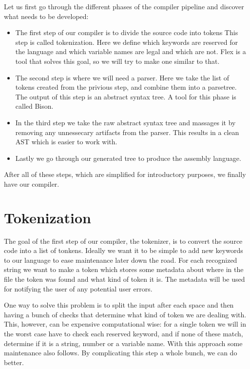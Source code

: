 \documentclass[a4paper,12pt]{report}
\begin{document}
Let us first go through the different phases of the compiler pipeline and discover what needs to be developed:
\begin{itemize}
  \item The first step of our compiler is to divide the source code into tokens This step is called tokenization. Here we define which keywords are reserved for the language and which variable names are legal and which are not. Flex is a tool that solves this goal, so we will try to make one similar to that.
  \item The second step is where we will need a parser. Here we take the list of tokens created from the privious step, and combine them into a parsetree. The output of this step is an abstract syntax tree. A tool for this phase is called Bison.
  \item In the third step we take the raw abstract syntax tree and massages it by removing any unnessecary artifacts from the parser. This results in a clean AST which is easier to work with.
  \item Lastly we go through our generated tree to produce the assembly language.
\end{itemize}

After all of these steps, which are simplified for introductory purposes, we finally have our compiler.

\chapter{Tokenization}
The goal of the first step of our compiler, the tokenizer, is to convert the source code into a list of tonkens. Ideally we want it to be simple to add new keywords to our language to ease maintenance later down the road. For each recognized string we want to make a token which stores some metadata about where in the file the token was found and what kind of token it is. The metadata will be used for notifying the user of any potential user errors.

One way to solve this problem is to split the input after each space and then having a bunch of checks that determine what kind of token we are dealing with. This, however, can be expensive computational wise: for a single token we will in the worst case have to check each reserved keyword, and if none of these match, determine if it is a string, number or a variable name. With this approach some maintenance also follows. By complicating this step a whole bunch, we can do better. 
\end{document}
